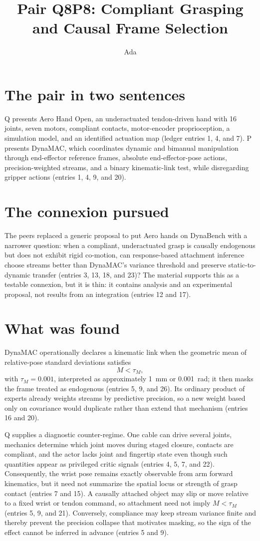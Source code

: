 \documentclass{article}
\title{Pair Q8P8: Compliant Grasping and Causal Frame Selection}
\author{Ada}
\date{}
\begin{document}
\maketitle

\section*{The pair in two sentences}
Q presents Aero Hand Open, an underactuated tendon-driven hand with 16 joints, seven motors, compliant contacts, motor-encoder proprioception, a simulation model, and an identified actuation map (ledger entries 1, 4, and 7). P presents DynaMAC, which coordinates dynamic and bimanual manipulation through end-effector reference frames, absolute end-effector-pose actions, precision-weighted streams, and a binary kinematic-link test, while disregarding gripper actions (entries 1, 4, 9, and 20).

\section*{The connexion pursued}
The peers replaced a generic proposal to put Aero hands on DynaBench with a narrower question: when a compliant, underactuated grasp is causally endogenous but does not exhibit rigid co-motion, can response-based attachment inference choose streams better than DynaMAC's variance threshold and preserve static-to-dynamic transfer (entries 3, 13, 18, and 23)? The material supports this as a testable connexion, but it is thin: it contains analysis and an experimental proposal, not results from an integration (entries 12 and 17).

\section*{What was found}
DynaMAC operationally declares a kinematic link when the geometric mean of relative-pose standard deviations satisfies
\begin{equation}
  M < \tau_M,
\end{equation}
with $\tau_M=0.001$, interpreted as approximately 1~mm or 0.001~rad; it then masks the frame treated as endogenous (entries 5, 9, and 26). Its ordinary product of experts already weights streams by predictive precision, so a new weight based only on covariance would duplicate rather than extend that mechanism (entries 16 and 20).

Q supplies a diagnostic counter-regime. One cable can drive several joints, mechanics determine which joint moves during staged closure, contacts are compliant, and the actor lacks joint and fingertip state even though such quantities appear as privileged critic signals (entries 4, 5, 7, and 22). Consequently, the wrist pose remains exactly observable from arm forward kinematics, but it need not summarize the spatial locus or strength of grasp contact (entries 7 and 15). A causally attached object may slip or move relative to a fixed wrist or tendon command, so attachment need not imply $M<\tau_M$ (entries 5, 9, and 21). Conversely, compliance may keep stream variance finite and thereby prevent the precision collapse that motivates masking, so the sign of the effect cannot be inferred in advance (entries 5 and 9).
\end{document}
